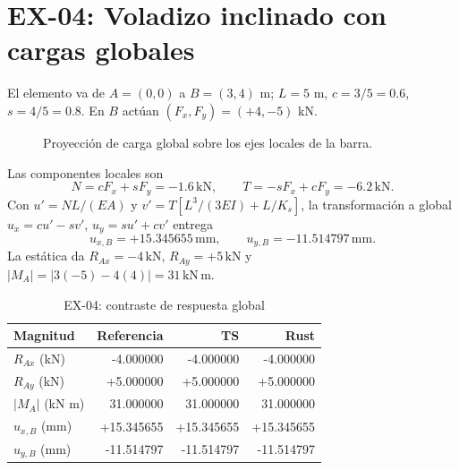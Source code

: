 \documentclass[11pt,a4paper]{article}
\newcommand{\kN}{\,\mathrm{kN}}
\newcommand{\kNm}{\,\mathrm{kN\,m}}
\newcommand{\mm}{\,\mathrm{mm}}
\newcommand{\m}{\,\mathrm{m}}
\newcommand{\caseheading}[2]{\section{#1: #2}}
\begin{document}
\caseheading{EX-04}{Voladizo inclinado con cargas globales}
El elemento va de $A=(0,0)$ a $B=(3,4)$ m; $L=5$ m,
$c=3/5=0.6$, $s=4/5=0.8$. En $B$ actúan
$(F_x,F_y)=(+4,-5)$ kN.
\begin{figure}[H]\centering
{}
\caption{Proyección de carga global sobre los ejes locales de la barra.}
\end{figure}
Las componentes locales son
\[
N=cF_x+sF_y=-1.6\kN,\qquad
T=-sF_x+cF_y=-6.2\kN.
\]
Con $u'=NL/(EA)$ y
$v'=T[L^3/(3EI)+L/K_s]$, la transformación a global
$u_x=cu'-sv'$, $u_y=su'+cv'$ entrega
\[
u_{x,B}=+15.345655\mm,\qquad
u_{y,B}=-11.514797\mm.
\]
La estática da $R_{Ax}=-4\kN$, $R_{Ay}=+5\kN$ y
$|M_A|=|3(-5)-4(4)|=31\kNm$.
\begin{table}[H]\centering
\caption{EX-04: contraste de respuesta global}
\begin{tabular}{@{}lrrr@{}}\toprule
Magnitud & Referencia & TS & Rust\\\midrule
$R_{Ax}$ (kN) & -4.000000 & -4.000000 & -4.000000\\
$R_{Ay}$ (kN) & +5.000000 & +5.000000 & +5.000000\\
$|M_A|$ (kN m) & 31.000000 & 31.000000 & 31.000000\\
$u_{x,B}$ (mm) & +15.345655 & +15.345655 & +15.345655\\
$u_{y,B}$ (mm) & -11.514797 & -11.514797 & -11.514797\\
\bottomrule\end{tabular}
\end{table}
\end{document}
